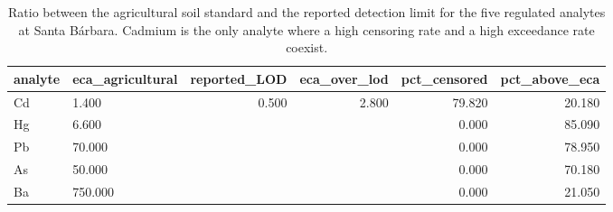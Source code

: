 \begin{table}[htbp]
\centering
\caption{Ratio between the agricultural soil standard and the reported detection limit for the five regulated analytes at Santa Bárbara. Cadmium is the only analyte where a high censoring rate and a high exceedance rate coexist.}
\label{tab:ecalod}
\footnotesize
\begin{tabular}{llrrrr}
\toprule
analyte & eca\_agricultural & reported\_LOD & eca\_over\_lod & pct\_censored & pct\_above\_eca \\
\midrule
Cd & 1.400 & 0.500 & 2.800 & 79.820 & 20.180 \\
Hg & 6.600 &  &  & 0.000 & 85.090 \\
Pb & 70.000 &  &  & 0.000 & 78.950 \\
As & 50.000 &  &  & 0.000 & 70.180 \\
Ba & 750.000 &  &  & 0.000 & 21.050 \\
\bottomrule
\end{tabular}
\end{table}
